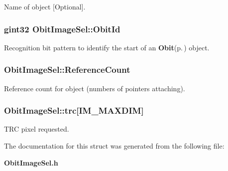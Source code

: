 Name of object [Optional]. 

\subsubsection{\setlength{\rightskip}{0pt plus 5cm}gint32 {\bf Obit\-Image\-Sel::Obit\-Id}}\label{structObitImageSel_o0}


Recognition bit pattern to identify the start of an {\bf Obit}{\rm (p.\,\pageref{structObit})} object. 

\subsubsection{ {\bf Obit\-Image\-Sel::Reference\-Count}}\label{structObitImageSel_o2}


Reference count for object (numbers of pointers attaching). 

\subsubsection{ {\bf Obit\-Image\-Sel::trc}[IM\_\-MAXDIM]}\label{structObitImageSel_o6}


TRC pixel requested. 



The documentation for this struct was generated from the following file:\begin{CompactItemize}
\item 
{\bf Obit\-Image\-Sel.h}\end{CompactItemize}

